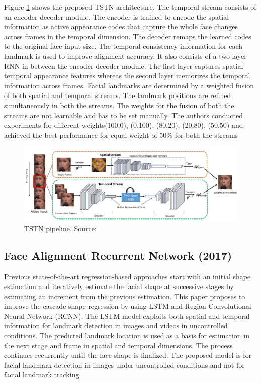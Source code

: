 \documentclass{llncs}
\begin{document}
Figure \ref{TSTN} shows the proposed TSTN architecture. The temporal stream consists of an encoder-decoder module. The encoder is trained to encode the spatial information as active appearance codes that capture the whole face changes across frames in the temporal dimension. The decoder remaps the learned codes to the original face input size. The temporal consistency information for each landmark is used to improve alignment accuracy. It also consists of a two-layer RNN in between the encoder-decoder module. The first layer captures spatial-temporal appearance features whereas the second layer memorizes the temporal information across frames. Facial landmarks are determined by a weighted fusion of both spatial and temporal streams. The landmark positions are refined simultaneously in both the streams.
The weights for the fusion of both the streams are not learnable and has to be set manually. The authors conducted experiments for different weights{(100,0), (0,100), (80,20), (20,80), (50,50)} and achieved the best performance for equal weight of 50\% for both the streams
\begin{figure}
	\centering
	\vspace{-7mm}
	\includegraphics[scale=0.5]{Media/TSTN}
	\vspace{-3mm}
	\caption{TSTN pipeline. Source:\cite{tstn}}
	\label{TSTN}
	\vspace{-3mm}
\end{figure}
\vspace{-8mm}
	\subsection{Face Alignment Recurrent Network (2017) \cite{farn}}

Previous state-of-the-art regression-based approaches start with an initial shape estimation and iteratively estimate the facial shape at successive stages by estimating an increment from the previous estimation. This paper proposes to improve the cascade shape regression by using LSTM and Region Convolutional Neural Network (RCNN). The LSTM model exploits both spatial and temporal information for landmark detection in images and videos in uncontrolled conditions. The predicted landmark location is used as a basis for estimation in the next stage and frame in spatial and temporal dimensions. The process continues recurrently until the face shape is finalized. The proposed model is for facial landmark detection in images under uncontrolled conditions and not for facial landmark tracking.
\end{document}

